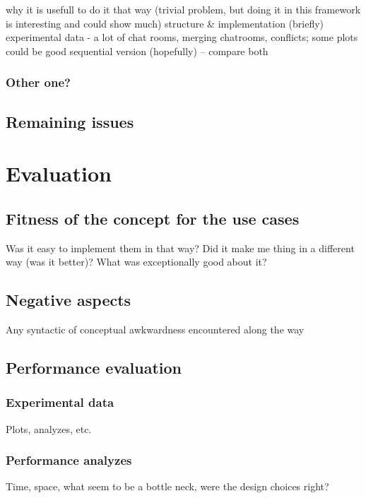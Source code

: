\documentclass[12pt,twoside,notitlepage]{report}
\begin{document}
 
 
 why it is usefull to do it that way (trivial problem, but doing it in this framework is interesting and could show much)
structure \& implementation (briefly)
experimental data - a lot of chat rooms, merging chatrooms, conflicts; some plots could be good
sequential version (hopefully) – compare both
   
\subsection{Other one?}

\section{Remaining issues}






\cleardoublepage
\chapter{Evaluation}

\section{Fitness of the concept for the use cases}
Was it easy to implement them in that way? Did it make me thing in a different way (was it better)? What was exceptionally good about it?

\section{Negative aspects}
Any syntactic of conceptual awkwardness encountered along the way

\section{Performance evaluation}
\subsection{Experimental data}
Plots, analyzes, etc.

\subsection{Performance analyzes}
Time, space, what seem to be a bottle neck, were the design choices right? 
\end{document}
